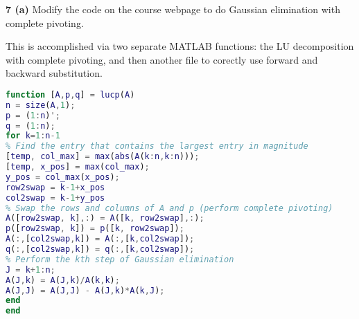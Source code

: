 \documentclass[12pt]{article}
\newcommand{\problem}[1]{\hspace{-4 ex} \large \textbf{#1}}
\begin{document}
\problem{7 (a)} Modify the code on the course webpage to do Gaussian elimination with complete pivoting.

	This is accomplished via two separate MATLAB functions: the LU decomposition with complete pivoting, and then another file to corectly use forward and backward substitution.
	\begin{lstlisting}[language=matlab]
function [A,p,q] = lucp(A)
n = size(A,1);
p = (1:n)';
q = (1:n);
for k=1:n-1
% Find the entry that contains the largest entry in magnitude
[temp, col_max] = max(abs(A(k:n,k:n)));
[temp, x_pos] = max(col_max);
y_pos = col_max(x_pos);
row2swap = k-1+x_pos
col2swap = k-1+y_pos
% Swap the rows and columns of A and p (perform complete pivoting)
A([row2swap, k],:) = A([k, row2swap],:);
p([row2swap, k]) = p([k, row2swap]);
A(:,[col2swap,k]) = A(:,[k,col2swap]);
q(:,[col2swap,k]) = q(:,[k,col2swap]);
% Perform the kth step of Gaussian elimination
J = k+1:n;
A(J,k) = A(J,k)/A(k,k);
A(J,J) = A(J,J) - A(J,k)*A(k,J);
end
end


	\end{lstlisting}
\end{document}

